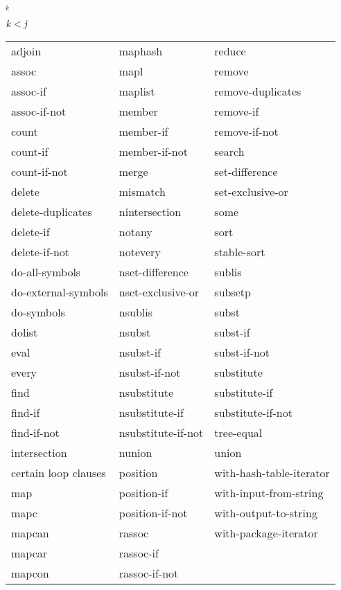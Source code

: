 {\newpage
\clearpage
\samepage ${}_k$
}

{\newpage
\clearpage
\samepage ${\it k\/}<{\it j}$
}

{\newpage
\clearpage
\samepage \begin{table}%
[t]
\begin{new}
\leavevmode
{}

\begingroup\cf {}\relax
\begin{tabular*}{\textwidth}{@{}l@{\extracolsep{\fill}}ll@{}}
adjoin & maphash & reduce \\ 
assoc & mapl & remove \\ 
assoc-if & maplist & remove-duplicates \\ 
assoc-if-not & member & remove-if \\ 
count & member-if & remove-if-not \\ 
count-if & member-if-not & search \\ 
count-if-not & merge & set-difference \\ 
delete & mismatch & set-exclusive-or \\ 
delete-duplicates & nintersection & some \\ 
delete-if & notany & sort \\ 
delete-if-not & notevery & stable-sort \\ 
do-all-symbols & nset-difference & sublis \\ 
do-external-symbols & nset-exclusive-or & subsetp \\ 
do-symbols & nsublis & subst \\ 
dolist & nsubst & subst-if \\ 
eval & nsubst-if & subst-if-not \\ 
every & nsubst-if-not & substitute \\ 
find & nsubstitute & substitute-if \\ 
find-if & nsubstitute-if & substitute-if-not \\ 
find-if-not & nsubstitute-if-not & tree-equal \\ 
intersection & nunion & union \\ 
{\rm certain} loop {\rm clauses} & position & with-hash-table-iterator \\ 
map & position-if & with-input-from-string \\ 
mapc & position-if-not & with-output-to-string \\ 
mapcan & rassoc & with-package-iterator \\ 
mapcar & rassoc-if \\ 
mapcon & rassoc-if-not
\end{tabular*}
\endgroup
\end{new}
\end{table}
}

